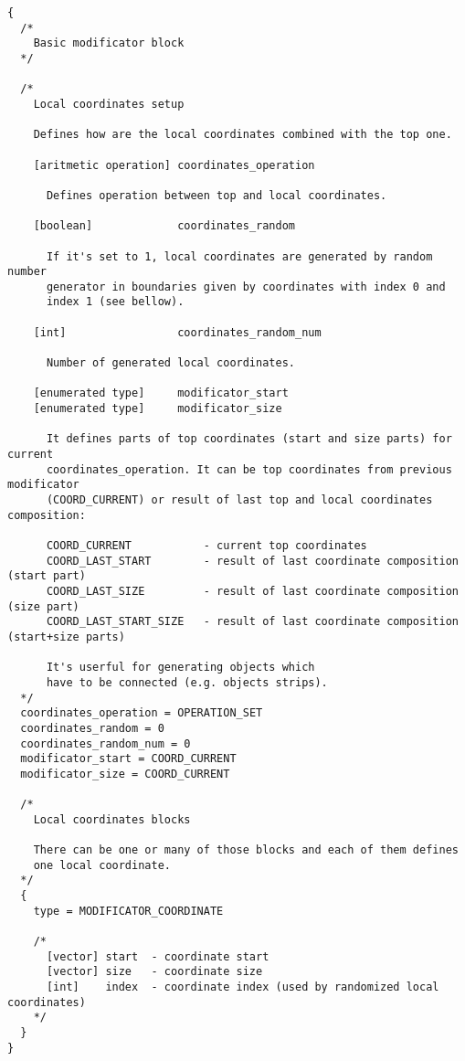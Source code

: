 \documentclass[11pt]{article}
\begin{document}
\begin{verbatim}
{
  /*
    Basic modificator block
  */

  /*
    Local coordinates setup
    
    Defines how are the local coordinates combined with the top one.
  
    [aritmetic operation] coordinates_operation 
    
      Defines operation between top and local coordinates.
    
    [boolean]             coordinates_random
    
      If it's set to 1, local coordinates are generated by random number
      generator in boundaries given by coordinates with index 0 and 
      index 1 (see bellow).
      
    [int]                 coordinates_random_num
    
      Number of generated local coordinates.
    
    [enumerated type]     modificator_start
    [enumerated type]     modificator_size
      
      It defines parts of top coordinates (start and size parts) for current 
      coordinates_operation. It can be top coordinates from previous modificator 
      (COORD_CURRENT) or result of last top and local coordinates composition:
      
      COORD_CURRENT           - current top coordinates
      COORD_LAST_START        - result of last coordinate composition (start part)
      COORD_LAST_SIZE         - result of last coordinate composition (size part)
      COORD_LAST_START_SIZE   - result of last coordinate composition (start+size parts)
      
      It's userful for generating objects which 
      have to be connected (e.g. objects strips).
  */  
  coordinates_operation = OPERATION_SET
  coordinates_random = 0
  coordinates_random_num = 0
  modificator_start = COORD_CURRENT
  modificator_size = COORD_CURRENT
  
  /*
    Local coordinates blocks
    
    There can be one or many of those blocks and each of them defines
    one local coordinate.
  */
  {
    type = MODIFICATOR_COORDINATE
    
    /*
      [vector] start  - coordinate start
      [vector] size   - coordinate size
      [int]    index  - coordinate index (used by randomized local coordinates)
    */
  }
}
\end{verbatim}
\end{document}
